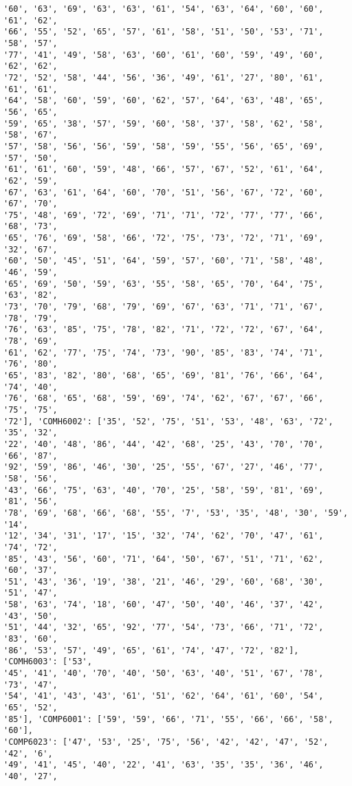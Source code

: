 \documentclass[11pt]{article}
\begin{document}
\begin{Verbatim}[commandchars=\\\{\}]
'60', '63', '69', '63', '63', '61', '54', '63', '64', '60', '60', '61', '62',
'66', '55', '52', '65', '57', '61', '58', '51', '50', '53', '71', '58', '57',
'77', '41', '49', '58', '63', '60', '61', '60', '59', '49', '60', '62', '62',
'72', '52', '58', '44', '56', '36', '49', '61', '27', '80', '61', '61', '61',
'64', '58', '60', '59', '60', '62', '57', '64', '63', '48', '65', '56', '65',
'59', '65', '38', '57', '59', '60', '58', '37', '58', '62', '58', '58', '67',
'57', '58', '56', '56', '59', '58', '59', '55', '56', '65', '69', '57', '50',
'61', '61', '60', '59', '48', '66', '57', '67', '52', '61', '64', '62', '59',
'67', '63', '61', '64', '60', '70', '51', '56', '67', '72', '60', '67', '70',
'75', '48', '69', '72', '69', '71', '71', '72', '77', '77', '66', '68', '73',
'65', '76', '69', '58', '66', '72', '75', '73', '72', '71', '69', '32', '67',
'60', '50', '45', '51', '64', '59', '57', '60', '71', '58', '48', '46', '59',
'65', '69', '50', '59', '63', '55', '58', '65', '70', '64', '75', '63', '82',
'73', '70', '79', '68', '79', '69', '67', '63', '71', '71', '67', '78', '79',
'76', '63', '85', '75', '78', '82', '71', '72', '72', '67', '64', '78', '69',
'61', '62', '77', '75', '74', '73', '90', '85', '83', '74', '71', '76', '80',
'65', '83', '82', '80', '68', '65', '69', '81', '76', '66', '64', '74', '40',
'76', '68', '65', '68', '59', '69', '74', '62', '67', '67', '66', '75', '75',
'72'], 'COMH6002': ['35', '52', '75', '51', '53', '48', '63', '72', '35', '32',
'22', '40', '48', '86', '44', '42', '68', '25', '43', '70', '70', '66', '87',
'92', '59', '86', '46', '30', '25', '55', '67', '27', '46', '77', '58', '56',
'43', '66', '75', '63', '40', '70', '25', '58', '59', '81', '69', '81', '56',
'78', '69', '68', '66', '68', '55', '7', '53', '35', '48', '30', '59', '14',
'12', '34', '31', '17', '15', '32', '74', '62', '70', '47', '61', '74', '72',
'85', '43', '56', '60', '71', '64', '50', '67', '51', '71', '62', '60', '37',
'51', '43', '36', '19', '38', '21', '46', '29', '60', '68', '30', '51', '47',
'58', '63', '74', '18', '60', '47', '50', '40', '46', '37', '42', '43', '50',
'51', '44', '32', '65', '92', '77', '54', '73', '66', '71', '72', '83', '60',
'86', '53', '57', '49', '65', '61', '74', '47', '72', '82'], 'COMH6003': ['53',
'45', '41', '40', '70', '40', '50', '63', '40', '51', '67', '78', '73', '47',
'54', '41', '43', '43', '61', '51', '62', '64', '61', '60', '54', '65', '52',
'85'], 'COMP6001': ['59', '59', '66', '71', '55', '66', '66', '58', '60'],
'COMP6023': ['47', '53', '25', '75', '56', '42', '42', '47', '52', '42', '6',
'49', '41', '45', '40', '22', '41', '63', '35', '35', '36', '46', '40', '27',

\end{Verbatim}
\end{document}
